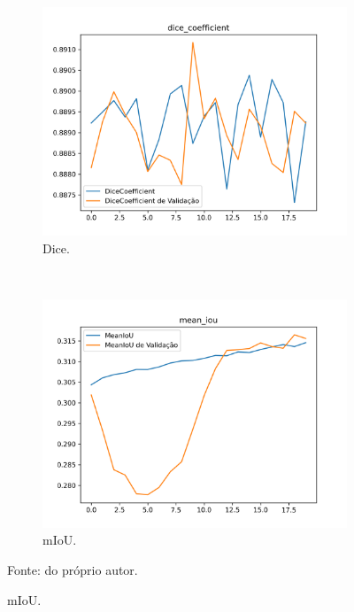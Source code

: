 \begin{figure}[H]
     \begin{subfigure}[t]{0.45\textwidth}
         \centering
         \includegraphics[width=1\linewidth]{recursos/imagens/results/max_unetlike20_miou_dice_coefficient.png}
         \caption{Dice.}
         \label{results:fig:semantic:8.3}
     \end{subfigure}
     ~
     \begin{subfigure}[t]{0.45\textwidth}
         \centering
         \includegraphics[width=1\linewidth]{recursos/imagens/results/max_unetlike20_miou_mean_iou.png}
         \caption{mIoU.}
         \label{results:fig:semantic:8.4}
     \end{subfigure}
     
     Fonte: do próprio autor.
\end{figure}

